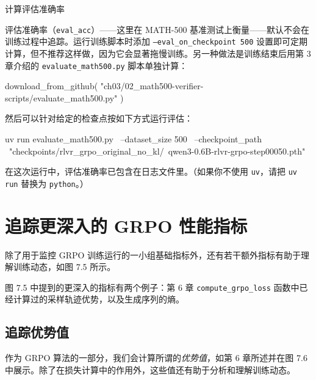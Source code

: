 \begin{mySidebar}{计算评估准确率}

评估准确率（\texttt{eval\_acc}）——这里在 MATH-500 基准测试上衡量——默认不会在训练过程中追踪。运行训练脚本时添加 \texttt{--eval\_on\_checkpoint 500} 设置即可定期计算，但不推荐这样做，因为它会显著拖慢训练。另一种做法是训练结束后用第 3 章介绍的 \texttt{evaluate\_math500.py} 脚本单独计算：

\begin{codebox}
download_from_github(
    "ch03/02_math500-verifier-scripts/evaluate_math500.py"
)
\end{codebox}

然后可以针对给定的检查点按如下方式运行评估：

\begin{codebox}
uv run evaluate_math500.py \
  --dataset_size 500 \
  --checkpoint_path \
    "checkpoints/rlvr_grpo_original_no_kl/\
qwen3-0.6B-rlvr-grpo-step00050.pth"
\end{codebox}

在这次运行中，评估准确率已包含在日志文件里。（如果你不使用 \texttt{uv}，请把 \texttt{uv run} 替换为 \texttt{python}。）

\end{mySidebar}

\section{追踪更深入的 GRPO 性能指标}

除了用于监控 GRPO 训练运行的一小组基础指标外，还有若干额外指标有助于理解训练动态，如图 7.5 所示。


图 7.5 中提到的更深入的指标有两个例子：第 6 章 \texttt{compute\_grpo\_loss} 函数中已经计算过的采样轨迹优势，以及生成序列的熵。

\subsection{追踪优势值}

作为 GRPO 算法的一部分，我们会计算所谓的\emph{优势值}，如第 6 章所述并在图 7.6 中展示。除了在损失计算中的作用外，这些值还有助于分析和理解训练动态。


